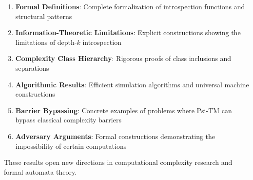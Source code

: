 \documentclass[11pt]{article}
\begin{document}
\begin{enumerate}
\item \textbf{Formal Definitions}: Complete formalization of introspection functions and structural patterns
\item \textbf{Information-Theoretic Limitations}: Explicit constructions showing the limitations of depth-$k$ introspection
\item \textbf{Complexity Class Hierarchy}: Rigorous proofs of class inclusions and separations
\item \textbf{Algorithmic Results}: Efficient simulation algorithms and universal machine constructions
\item \textbf{Barrier Bypassing}: Concrete examples of problems where Psi-TM can bypass classical complexity barriers
\item \textbf{Adversary Arguments}: Formal constructions demonstrating the impossibility of certain computations
\end{enumerate}

These results open new directions in computational complexity research and formal automata theory.
\end{document}
